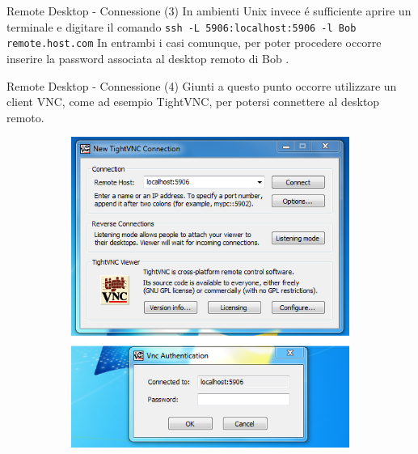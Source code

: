\documentclass{beamer}
\begin{document}
\begin{frame}{Remote Desktop - Connessione (3)}
 In ambienti Unix invece \'e sufficiente aprire un terminale e digitare il comando
\newline
\texttt{ssh -L 5906:localhost:5906 -l Bob remote.host.com}
\newline
In entrambi i casi comunque, per poter procedere occorre inserire la password associata al desktop remoto di Bob .
\end{frame}


\begin{frame}{Remote Desktop - Connessione (4)}
Giunti a questo punto occorre utilizzare un client VNC, come ad esempio TightVNC, per potersi connettere al desktop remoto.
\begin{figure}
\centering
\begin{subfigure}{.5\textwidth}
  \centering
  \includegraphics[scale=0.3]{images/tightvnc.png}
\end{subfigure}%
\begin{subfigure}{.5\textwidth}
  \centering

\end{subfigure}
\end{figure}
\end{frame}
\end{document}
